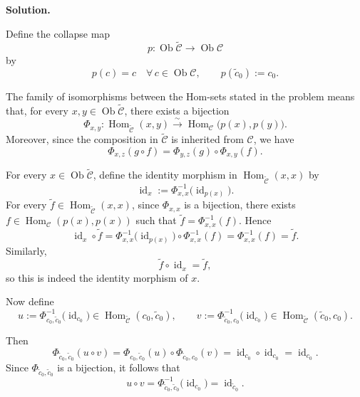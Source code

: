 \documentclass[11pt,a4paper]{article}
\newcounter{problem}
\newcounter{saveequation}
\newenvironment{solution}
{
	\par
	\setcounter{saveequation}{\value{equation}}
	\begingroup
	\setcounter{equation}{0}
	\renewcommand{\theequation}{\arabic{problem}.\arabic{equation}}
	\renewcommand{\theHequation}{sol.\arabic{problem}.\arabic{equation}}
	\noindent\textbf{Solution.}\quad
}
{
	\par
	\endgroup
	\setcounter{equation}{\value{saveequation}}
}
\begin{document}
	\begin{solution}
		Define the collapse map
		\[
		p:\operatorname{Ob}\widetilde{\mathcal C}
		\longrightarrow
		\operatorname{Ob}\mathcal C
		\]
		by
		\[
		p(c)=c
		\quad
		\forall\,c\in\operatorname{Ob}\mathcal C,
		\qquad
		p(\widetilde c_0):=c_0.
		\]
		
		The family of isomorphisms between the Hom-sets stated in the problem means that, for every
		\(x,y\in\operatorname{Ob}\widetilde{\mathcal C}\), there exists a bijection
		\[
		\Phi_{x,y}:
		\operatorname{Hom}_{\widetilde{\mathcal C}}(x,y)
		\xrightarrow{\sim}
		\operatorname{Hom}_{\mathcal C}\bigl(p(x),p(y)\bigr).
		\]
		Moreover, since the composition in \(\widetilde{\mathcal C}\) is inherited from
		\(\mathcal C\), we have
		\[
		\Phi_{x,z}(g\circ f)
		=
		\Phi_{y,z}(g)\circ\Phi_{x,y}(f).
		\]
		
		For every \(x\in\operatorname{Ob}\widetilde{\mathcal C}\), define the identity
		morphism in \(\operatorname{Hom}_{\widetilde{\mathcal C}}(x,x)\) by
		\[
		\operatorname{id}_x
		:=
		\Phi_{x,x}^{-1}\bigl(\operatorname{id}_{p(x)}\bigr).
		\]
		For every
		\(\widetilde f\in\operatorname{Hom}_{\widetilde{\mathcal C}}(x,x)\), since
		\(\Phi_{x,x}\) is a bijection, there exists
		\(f\in\operatorname{Hom}_{\mathcal C}(p(x),p(x))\) such that
		\(\widetilde f=\Phi_{x,x}^{-1}(f)\). Hence
		\[
		\operatorname{id}_x\circ\widetilde f
		=
		\Phi_{x,x}^{-1}\bigl(\operatorname{id}_{p(x)}\bigr)
		\circ
		\Phi_{x,x}^{-1}(f)
		=
		\Phi_{x,x}^{-1}(f)
		=
		\widetilde f.
		\]
		Similarly,
		\[
		\widetilde f\circ\operatorname{id}_x=\widetilde f,
		\]
		so this is indeed the identity morphism of \(x\).
		
		Now define
		\[
		u
		:=
		\Phi_{c_0,\widetilde c_0}^{-1}
		\bigl(\operatorname{id}_{c_0}\bigr)
		\in
		\operatorname{Hom}_{\widetilde{\mathcal C}}
		(c_0,\widetilde c_0),
		\qquad
		v
		:=
		\Phi_{\widetilde c_0,c_0}^{-1}
		\bigl(\operatorname{id}_{c_0}\bigr)
		\in
		\operatorname{Hom}_{\widetilde{\mathcal C}}
		(\widetilde c_0,c_0).
		\]
		
		Then
		\[
		\Phi_{\widetilde c_0,\widetilde c_0}(u\circ v)
		=
		\Phi_{c_0,\widetilde c_0}(u)
		\circ
		\Phi_{\widetilde c_0,c_0}(v)
		=
		\operatorname{id}_{c_0}\circ\operatorname{id}_{c_0}
		=
		\operatorname{id}_{c_0}.
		\]
		Since \(\Phi_{\widetilde c_0,\widetilde c_0}\) is a bijection, it follows that
		\[
		u\circ v
		=
		\Phi_{\widetilde c_0,\widetilde c_0}^{-1}
		\bigl(\operatorname{id}_{c_0}\bigr)
		=
		\operatorname{id}_{\widetilde c_0}.
		\]
		

\end{solution}
\end{document}
